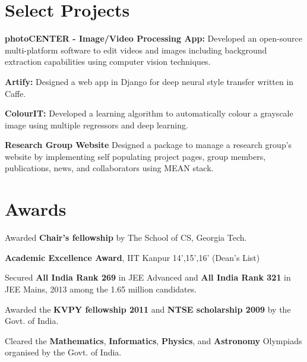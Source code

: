 \documentclass[US paper]{deedy-resume} %
\begin{document}
{\vspace{1mm}

\vspace{-5pt}

\section{Select Projects}

\vspace{5pt}
\begin{tightitemize}
\item \textbf{photoCENTER - Image/Video Processing App:} Developed an open-source multi-platform software to edit videos and images including background extraction capabilities using computer vision techniques. \vspace{0.5mm}
\item \textbf{Artify:} Designed a web app in Django for deep neural style transfer written in Caffe.
\vspace{0.5mm}
\item \textbf{ColourIT:} Developed a learning algorithm to automatically colour a grayscale image using multiple regressors and deep learning. \vspace{0.5mm}
\item \textbf{Research Group Website} Designed a package to manage a research group's website by implementing self populating project pages, group members, publications, news, and collaborators using MEAN stack.
\end{tightitemize}


\vspace{-3pt}
\sectionspace %


\vspace{-5pt}

\vspace{-3pt}
\section{Awards} 
\runsubsection{}
\location{}
\vspace{5pt}
{
\begin{tightitemize}
\item Awarded \textbf{Chair's fellowship} by The School of CS, Georgia Tech.
\item \textbf{Academic Excellence Award}, IIT Kanpur 14',15',16' (Dean's List)
\item Secured \textbf{All India Rank 269} in JEE Advanced and \textbf{All India Rank 321} in JEE Mains, 2013  among the 1.65 million candidates.
\item Awarded the \textbf{KVPY fellowship 2011} and \textbf{NTSE scholarship 2009} by the Govt. of India.
\item Cleared the \textbf{Mathematics}, \textbf{Informatics}, \textbf{Physics}, and \textbf{Astronomy} Olympiads organised by the Govt. of India.
\end{tightitemize}
}
\vspace{-5pt}
}
\end{document}
